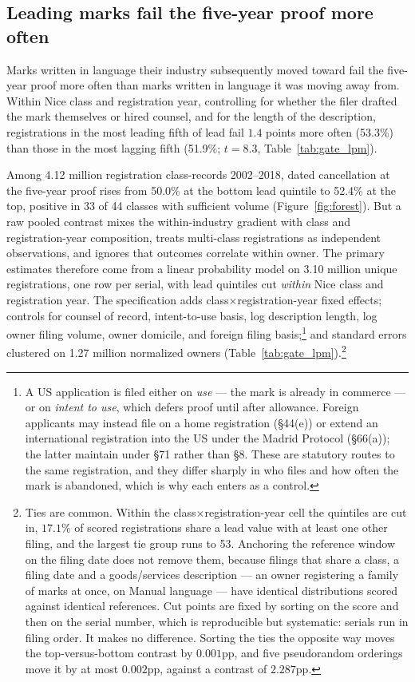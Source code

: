 \subsection{Leading marks fail the five-year proof more often}\label{sec:gate_headline}

Marks written in language their industry subsequently moved toward fail
the five-year proof more often than marks written in language it was
moving away from. Within Nice class and registration year, controlling for
whether the filer drafted the mark themselves or hired counsel, and for
the length of the description, registrations in the most leading fifth of
lead fail $1.4$ points more often (53.3\%) than those in the most lagging
fifth (51.9\%; $t = 8.3$, Table~\ref{tab:gate_lpm}).

Among 4.12 million registration class-records 2002--2018, dated
cancellation at the five-year proof rises from 50.0\% at the bottom
lead quintile to 52.4\% at the top, positive in 33 of 44 classes with
sufficient volume (Figure~\ref{fig:forest}). But a raw pooled contrast
mixes the within-industry gradient with class and registration-year
composition, treats multi-class registrations as independent observations,
and ignores that outcomes correlate within owner. The primary estimates
therefore come from a linear probability model on 3.10 million unique
registrations, one row per serial, with lead quintiles cut \emph{within}
Nice class and registration year. The specification adds
class$\times$registration-year fixed effects; controls for counsel of
record, intent-to-use basis, log description length, log owner filing
volume, owner domicile, and foreign filing basis;\footnote{A US
application is filed either on \emph{use} --- the mark is already in
commerce --- or on \emph{intent to use}, which defers proof until after
allowance. Foreign applicants may instead file on a home registration
(\S44(e)) or extend an international registration into the US under the
Madrid Protocol (\S66(a)); the latter maintain under \S71 rather than
\S8. These are statutory routes to the same registration, and they differ
sharply in who files and how often the mark is abandoned, which is why
each enters as a control.} and standard errors clustered on 1.27 million
normalized owners (Table~\ref{tab:gate_lpm}).\footnote{Ties are common.
Within the class$\times$registration-year cell the quintiles are cut in,
$17.1$\% of scored registrations share a lead value with at least one
other filing, and the largest tie group runs to 53. Anchoring the
reference window on the filing date does not remove them, because filings
that share a class, a filing date and a goods/services description --- an
owner registering a family of marks at once, on Manual language --- have
identical distributions scored against identical references. Cut points
are fixed by sorting on the score and then on the serial number, which is
reproducible but systematic: serials run in filing order. It makes no
difference. Sorting the ties the opposite way moves the top-versus-bottom
contrast by $0.001$pp, and five pseudorandom orderings move it by at most
$0.002$pp, against a contrast of $2.287$pp.}

